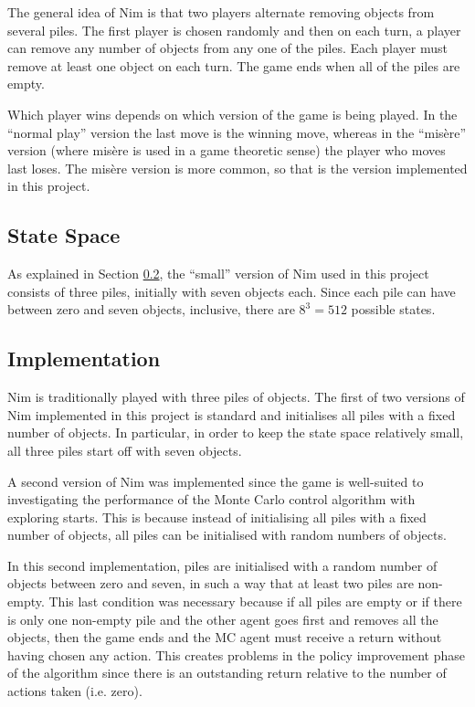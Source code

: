 \documentclass[11pt,a4paper]{report}
\begin{document}
The general idea of Nim \cite{nim-rules} is that two players alternate removing objects from several piles. The first player is chosen randomly and then on each turn, a player can remove any number of objects from any one of the piles. Each player must remove at least one object on each turn. The game ends when all of the piles are empty.

Which player wins depends on which version of the game is being played. In the ``normal play'' version the last move is the winning move, whereas in the ``mis\`ere'' version (where mis\`ere is used in a game theoretic sense) the player who moves last loses. The mis\`ere version is more common, so that is the version implemented in this project.


\subsection{State Space}

As explained in Section \ref{sec:NimImplementation}, the ``small'' version of Nim used in this project  consists of three piles, initially with seven objects each. Since each pile can have between zero and seven objects, inclusive, there are $8^3 = 512$ possible states.


\subsection{Implementation}
\label{sec:NimImplementation}

Nim is traditionally played with three piles of objects. The first of two versions of Nim implemented in this project is standard and initialises all piles with a fixed number of objects. In particular, in order to keep the state space relatively small, all three piles start off with seven objects.

A second version of Nim was implemented since the game is well-suited to investigating the performance of the Monte Carlo control algorithm with exploring starts. This is because instead of initialising all piles with a fixed number of objects, all piles can be initialised with random numbers of objects.

In this second implementation, piles are initialised with a random number of objects between zero and seven, in such a way that at least two piles are non-empty. This last condition was necessary because if all piles are empty or if there is only one non-empty pile and the other agent goes first and removes all the objects, then the game ends and the MC agent must receive a return without having chosen any action. This creates problems in the policy improvement phase of the algorithm since there is an outstanding return relative to the number of actions taken (i.e. zero).
\end{document}
